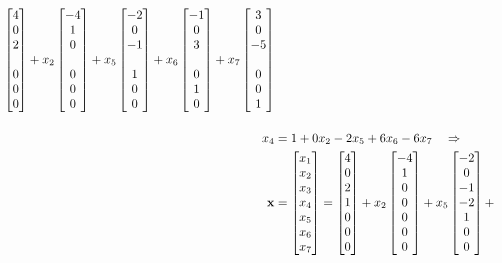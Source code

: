 \documentclass{ximera}
\begin{document}
\begin{example}
\begin{align*}
    \colvector{4\\0\\2\\\ \\0\\0\\0}+
    x_2\colvector{-4\\1\\0\\\ \\0\\0\\0}+
    x_5\colvector{-2\\0\\-1\\\ \\1\\0\\0}+
    x_6\colvector{-1\\0\\3\\\ \\0\\1\\0}+
    x_7\colvector{3\\0\\-5\\\ \\0\\0\\1}\\[12pt]
    x_4&=1+0x_2-2x_5+6x_6-6x_7\quad\Rightarrow\\
    \vect{x}&=\colvector{x_1\\x_2\\x_3\\x_4\\x_5\\x_6\\x_7}=
    \colvector{4\\0\\2\\1\\0\\0\\0}+
    x_2\colvector{-4\\1\\0\\0\\0\\0\\0}+
    x_5\colvector{-2\\0\\-1\\-2\\1\\0\\0}+

\end{align*}
\end{example}
\end{document}
